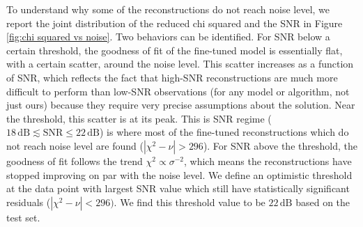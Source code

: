 To understand why some of the reconstructions do not reach noise level, we 
report the joint distribution of the reduced chi squared and the SNR in Figure \ref{fig:chi squared vs noise}.
Two behaviors can be identified. For SNR below a certain threshold, the goodness of fit 
of the fine-tuned model is essentially flat, with a certain scatter, around the noise level. 
This scatter increases as a function of SNR, which reflects the fact that high-SNR reconstructions are much more difficult to perform than low-SNR observations (for any model or algorithm, not just ours) because they require very precise assumptions about the solution. 
Near the threshold, this scatter is at its peak. This is SNR regime ($18\,\mathrm{dB} \lesssim \mathrm{SNR} \leq 22\,\mathrm{dB}$) is where most of the fine-tuned reconstructions which do not reach noise level are found ($|\chi^2 - \nu| > 296$).
For SNR above the threshold, 
the goodness of fit follows the trend $\chi^2 \propto \sigma^{-2}$, which 
means the reconstructions have stopped improving on par with the noise level.
We define an optimistic threshold at the data point with largest 
SNR value which still have statistically significant residuals ($|\chi^2 - \nu| < 296)$. We 
find this threshold value to be $22\, \mathrm{dB}$ based on the test set. 




